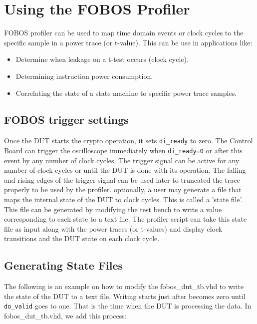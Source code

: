 \chapter{Using the FOBOS Profiler} \label{chap:fobos-profiler}
FOBOS profiler can be used to map time domain events or clock cycles to the specific sample in a power trace (or t-value).
This can be use in applications like:
\begin{itemize}
 \item Determine when leakage on a t-test occurs (clock cycle).
 \item Determining instruction power consumption.
 \item Correlating the state of a state machine to specific power trace samples.
\end{itemize}

\section{FOBOS trigger settings}
Once the DUT starts the crypto operation, it sets \texttt{di\_ready} to zero. 
The Control Board can trigger the oscilloscope immediately when \texttt{di\_ready=0} or after this event by any number of clock cycles. 
The trigger signal can be active for any number of clock cycles or until the DUT is done with its operation.
The falling and rising edges of the trigger signal can be used later to truncated the trace properly to be used by the profiler.
\newline 
optionally, a user may generate a file that maps the internal state of the DUT to clock cycles. This is called a 'state file'. 
This file can be generated by modifying the test bench to write a value corresponding to each state to a text file.
The profiler script can take this state file as input along with the power traces (or t-values) and display clock transitions and the DUT state on each clock cycle.



\section{Generating State Files}

The following is an example on how to modify the fobos\_dut\_tb.vhd to write the state of the DUT to a text file.
Writing starts just after  becomes zero until \texttt{do\_valid} goes to one. That is the time when the DUT is processing the data.
\newline
In fobos\_dut\_tb.vhd, we add this process:

